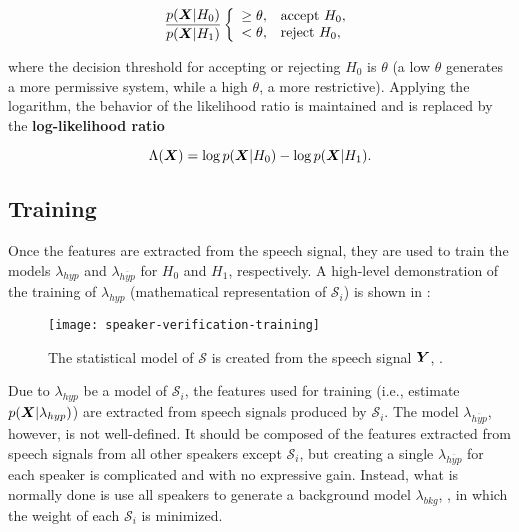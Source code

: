 \begin{equation}
    \frac{\postpdf{\dvec{X}}{H_0}}{\postpdf{\dvec{X}}{H_1}} \verifytestB{\theta}{H_0}
    \label{eq:likelihood-ratio-test}
\end{equation}

\noindent where the decision threshold for accepting or rejecting $H_0$ is $\theta$ (a low $\theta$ generates a more permissive system, while a high $\theta$, a more restrictive). Applying the logarithm, the behavior of the likelihood ratio is maintained and  is replaced by the \textbf{log-likelihood ratio}

\begin{equation}
    \Lambda(\dvec{X}) = \log \postpdf{\dvec{X}}{H_0} - \log \postpdf{\dvec{X}}{H_1}.
    \label{eq:log-likelihood-ratio-test}
\end{equation}

\subsection{Training}

Once the features are extracted from the speech signal, they are used to train the models $\lambda_{hyp}$ and $\lambda_{\overline{hyp}}$ for $H_0$ and $H_1$, respectively. A high-level demonstration of the training of $\lambda_{hyp}$ (mathematical representation of $\mathcal{S}_i$) is shown in :

\begin{figure}[ht]
    \centering
    \texttt{[image: speaker-verification-training]}
    \caption{The statistical model of $\mathcal{S}$ is created from the speech signal $\boldsymbol{Y}$, .}
    \label{fig:speaker-verification-training}
\end{figure}

Due to $\lambda_{hyp}$ be a model of $\mathcal{S}_i$, the features used for training (i.e., estimate $p(\boldsymbol{X}|\lambda_{hyp})$) are extracted from speech signals produced by $\mathcal{S}_i$. The model $\lambda_{\overline{hyp}}$, however, is not well-defined. It should be composed of the features extracted from speech signals from all other speakers except $\mathcal{S}_i$, but creating a single $\lambda_{\overline{hyp}}$ for each speaker is complicated and with no expressive gain. Instead, what is normally done is use all speakers to generate a background model $\lambda_{bkg}$, , in which the weight of each $\mathcal{S}_i$ is minimized.

